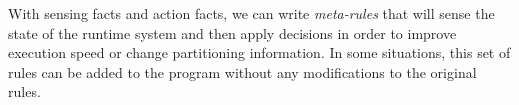 With sensing facts and action facts, we can write \emph{meta-rules} that will
sense the state of the runtime system and then apply decisions in order to
improve execution speed or change partitioning information. In some situations,
this set of rules can be added to the program without any modifications to the
original rules.

